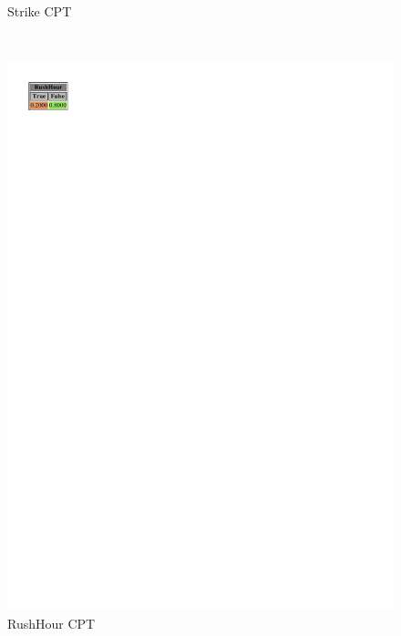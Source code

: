 \documentclass[a4paper,12pt]{article} %
\begin{document}
\begin{figure}[H]
\begin{minipage}[c]{.3\textwidth}
		\caption*{Strike CPT}
		\label{fig:strike}
	\end{minipage}
	~
	\begin{minipage}[c]{.3\textwidth}
		\centering
		\includegraphics[width=.5\linewidth]{../code/rushhour.pdf}	
		\caption*{RushHour CPT}
		\label{fig:rushhour}
	\end{minipage}
\end{figure}
\end{document}
